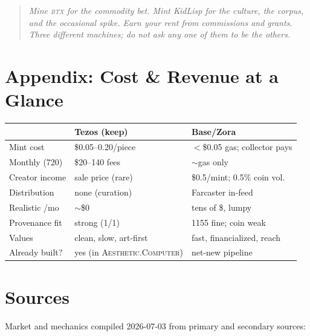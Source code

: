 \documentclass[10pt,letterpaper,twocolumn]{article}
\newcommand{\ac}{\textsc{Aesthetic.Computer}}
\begin{document}
\begin{quote}
\small\itshape
Mine \textsc{btx} for the commodity bet. Mint KidLisp for the culture, the corpus, and the occasional spike. Earn your rent from commissions and grants. Three different machines; do not ask any one of them to be the others.
\end{quote}

\section{Appendix: Cost \& Revenue at a Glance}

\begin{center}
\small
\begin{tabularx}{\columnwidth}{@{}lXX@{}}
\toprule
 & \textbf{Tezos (keep)} & \textbf{Base/Zora} \\
\midrule
Mint cost & \$0.05--0.20/piece & $<$\$0.05 gas; collector pays \\
Monthly (720) & \$20--140 fees & $\sim$gas only \\
Creator income & sale price (rare) & \$0.5/mint; 0.5\% coin vol.\ \\
Distribution & none (curation) & Farcaster in-feed \\
Realistic /mo & $\sim$\$0 & tens of \$, lumpy \\
Provenance fit & strong (1/1) & 1155 fine; coin weak \\
Values & clean, slow, art-first & fast, financialized, reach \\
Already built? & yes (in \ac{}) & net-new pipeline \\
\bottomrule
\end{tabularx}
\end{center}

\vspace{0.4em}
\section*{Sources}
\small
\noindent Market and mechanics compiled 2026-07-03 from primary and secondary sources:
\end{document}
